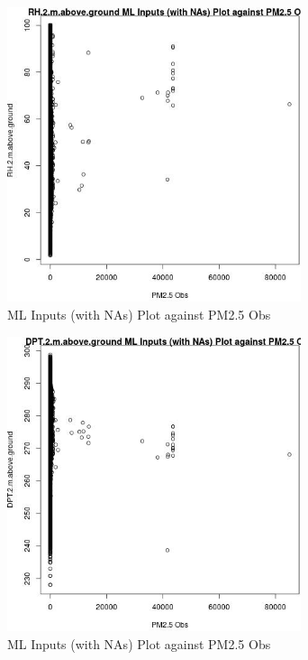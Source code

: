 \begin{figure} 
\centering  
\includegraphics[width=0.77\textwidth]{Code_Outputs/Report_ML_input_PM25_Step4_part_f_de_duplicated_aveswNAs_RH2mabovegroundvPM25_Obs.jpg} 
\caption{\label{fig:Report_ML_input_PM25_Step4_part_f_de_duplicated_aveswNAsRH2mabovegroundvPM25_Obs}ML Inputs (with NAs) Plot against PM2.5 Obs} 
\end{figure} 
 

\begin{figure} 
\centering  
\includegraphics[width=0.77\textwidth]{Code_Outputs/Report_ML_input_PM25_Step4_part_f_de_duplicated_aveswNAs_DPT2mabovegroundvPM25_Obs.jpg} 
\caption{\label{fig:Report_ML_input_PM25_Step4_part_f_de_duplicated_aveswNAsDPT2mabovegroundvPM25_Obs}ML Inputs (with NAs) Plot against PM2.5 Obs} 
\end{figure} 
 

